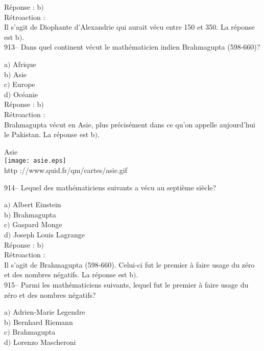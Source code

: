 ﻿\documentclass[letterpaper, 12pt]{article}
\begin{document}
R\'eponse : b$)$\\

R\'etroaction :\\
Il s'agit de Diophante d'Alexandrie qui aurait v\'ecu entre 150 et 350. La
r\'eponse est b$)$.\\

913-- Dans quel continent v\'ecut le math\'ematicien indien
Brahmagupta (598-660)?

a$)$ Afrique \\
b$)$ Asie \\
c$)$ Europe \\
d$)$ Oc\'eanie  \\

R\'eponse : b$)$\\

R\'etroaction : \\
Brahmagupta v\'ecut en Asie, plus pr\'ecis\'ement dans ce qu'on appelle
aujourd'hui le Pakistan. La r\'eponse est b$)$.\\

        \begin{center}
        Asie\\
    \texttt{[image: asie.eps]}\\
        {\footnotesize http ://www.quid.fr/qm/cartes/asie.gif}
    \end{center}

914-- Lequel des math\'ematiciens suivants a v\'ecu au septi\`eme
si\`ecle?

a$)$ Albert Einstein \\
b$)$ Brahmagupta \\
c$)$ Gaspard Monge \\
d$)$ Joseph Louis Lagrange\\

R\'eponse : b$)$\\

R\'etroaction : \\
Il s'agit de Brahmagupta (598-660). Celui-ci fut le premier \`a faire usage
du z\'ero et des nombres n\'egatifs. La r\'eponse est b$)$.\\

915-- Parmi les math\'ematiciens suivants, lequel fut le premier \`a
faire usage du z\'ero et des nombres n\'egatifs?

a$)$ Adrien-Marie Legendre  \\
b$)$ Bernhard Riemann \\
c$)$ Brahmagupta \\
d$)$ Lorenzo Mascheroni \\
\end{document}
